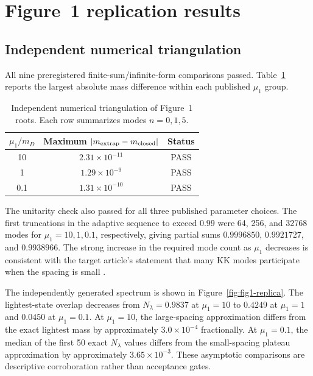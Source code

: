\section{Figure~1 replication results}\label{sec:results-fig1}

\subsection{Independent numerical triangulation}\label{sec:triangulation}

All nine preregistered finite-sum/infinite-form comparisons passed. Table~\ref{tab:triangulation} reports the largest absolute mass difference within each published $\mu_1$ group.

\begin{table}[H]
\centering
\caption{Independent numerical triangulation of Figure~1 roots. Each row summarizes modes $n=0,1,5$.}
\label{tab:triangulation}
\begin{tabular}{@{}ccc@{}}
\toprule
$\mu_1/m_D$ & Maximum $|m_{\rm extrap}-m_{\rm closed}|$ & Status \\
\midrule
10  & $2.31\times10^{-11}$ & PASS \\
1   & $1.29\times10^{-9}$  & PASS \\
0.1 & $1.31\times10^{-10}$ & PASS \\
\bottomrule
\end{tabular}
\end{table}

The unitarity check also passed for all three published parameter choices. The first truncations in the adaptive sequence to exceed $0.99$ were 64, 256, and 32768 modes for $\mu_1=10,1,0.1$, respectively, giving partial sums $0.9996850$, $0.9921727$, and $0.9938966$. The strong increase in the required mode count as $\mu_1$ decreases is consistent with the target article's statement that many KK modes participate when the spacing is small \autocite{degiorgi2026}.

The independently generated spectrum is shown in Figure~\ref{fig:fig1-replica}. The lightest-state overlap decreases from $N_\lambda=0.9837$ at $\mu_1=10$ to $0.4249$ at $\mu_1=1$ and $0.0450$ at $\mu_1=0.1$. At $\mu_1=10$, the large-spacing approximation differs from the exact lightest mass by approximately $3.0\times10^{-4}$ fractionally. At $\mu_1=0.1$, the median of the first 50 exact $N_\lambda$ values differs from the small-spacing plateau approximation by approximately $3.65\times10^{-3}$. These asymptotic comparisons are descriptive corroboration rather than acceptance gates.

